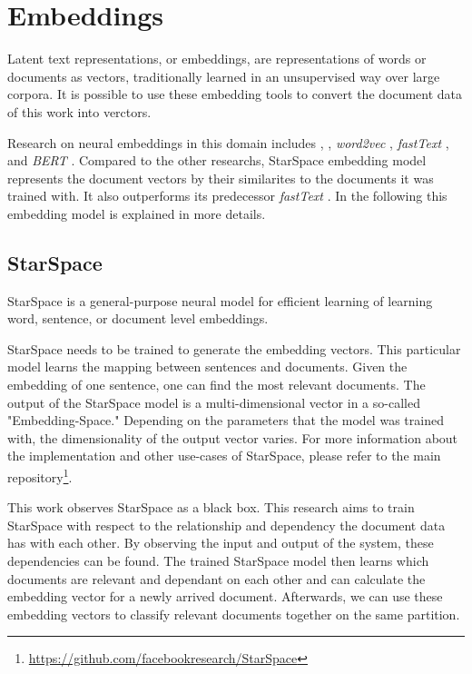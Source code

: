 \section{Embeddings}
\label{sec:embeddings}
Latent text representations, or embeddings, are representations of words or documents as vectors, traditionally learned in an unsupervised way over large corpora. It is possible to use these embedding tools to convert the document data of this work into verctors. 

Research on neural embeddings in this domain includes \cite{bengioNeuralProbabilisticLanguage2003}, 
\cite{collobertNaturalLanguageProcessing2011}, \emph{word2vec} \cite{goldbergWord2vecExplainedDeriving2014}, \emph{fastText} \cite{joulinFastTextZipCompressing2016}, and \emph{BERT} \cite{devlinBERTPretrainingDeep2019}. Compared to the other researchs, StarSpace embedding model represents the document vectors by their similarites to the documents it was trained with. It also outperforms its predecessor \emph{fastText} \cite{wuStarSpaceEmbedAll2017}. In the following this embedding model is explained in more details.

\subsection{StarSpace}
\label{subsec:StarSpace}
StarSpace \cite{wuStarSpaceEmbedAll2017} is a general-purpose neural model for efficient learning of learning word, sentence, or document level embeddings.


StarSpace needs to be trained to generate the embedding vectors. This particular model learns the mapping between sentences and documents. Given the embedding of one sentence, one can find the most relevant documents. The output of the StarSpace model is a multi-dimensional vector in a so-called "Embedding-Space." Depending on the parameters that the model was trained with, the dimensionality of the output vector varies. For more information about the implementation and other use-cases of StarSpace, please refer to the main repository\footnote{\url{https://github.com/facebookresearch/StarSpace}}.


This work observes StarSpace as a black box. This research aims to train StarSpace with respect to the relationship and dependency the document data has with each other. By observing the input and output of the system, these dependencies can be found. The trained StarSpace model then learns which documents are relevant and dependant on each other and can calculate the embedding vector for a newly arrived document. Afterwards, we can use these embedding vectors to classify relevant documents together on the same partition.

